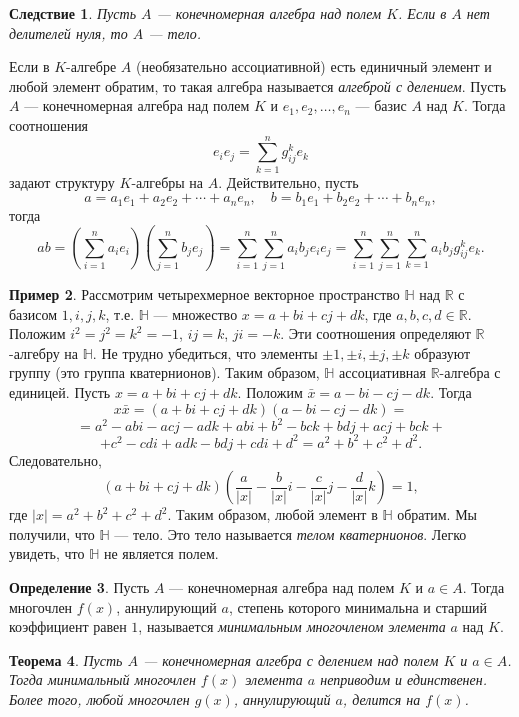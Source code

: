\documentclass[12pt, titlepage, oneside]{amsbook}
\newcommand{\HH}{\mathbb{H}}
\newcommand{\RR}{\mathbb{R}}
\newtheorem{theorem}{Теорема}[chapter]
\newtheorem{corollary}[theorem]{Следствие}
\theoremstyle{definition}
\newtheorem{example}[theorem]{Пример}
\newtheorem{definition}[theorem]{Определение}
\theoremstyle{remark}
\begin{document}
\begin{corollary}
	\label{Algebra4}
	Пусть $A$ --- конечномерная алгебра над полем $K$. Если в $A$ нет делителей нуля, то $A$ --- тело.
\end{corollary}

Если в $K$-алгебре $A$ (необязательно ассоциативной) есть единичный элемент и любой элемент обратим, то такая алгебра называется \emph{алгеброй с делением}.
Пусть $A$ --- конечномерная алгебра над полем $K$ и $e_1,e_2,\ldots,e_n$ --- базис $A$ над $K$. Тогда соотношения $$e_ie_j=\sum\limits_{k=1}^n g_{ij}^k e_k$$ задают структуру $K$-алгебры на $A$. Действительно, пусть $$a=a_1e_1+a_2e_2+\cdots+a_ne_n,\quad b=b_1e_1+b_2e_2+\cdots+b_n e_n,$$ тогда $$ab=\left(\sum\limits_{i=1}^n a_ie_i\right)\left(\sum\limits_{j=1}^n b_je_j\right)=\sum\limits_{i=1}^n\sum\limits_{j=1}^n a_ib_je_ie_j=\sum\limits_{i=1}^n\sum\limits_{j=1}^n\sum\limits_{k=1}^na_ib_jg_{ij}^k e_k.$$


\begin{example}
	Рассмотрим четырехмерное векторное пространство $\HH$ над $\RR$ с базисом $1,i,j,k$, т.е. $\HH$ --- множество $x=a+bi+cj+dk$, где $a,b,c,d\in\RR$. Положим $i^2=j^2=k^2=-1$, $ij=k$, $ji=-k$. Эти соотношения определяют $\RR$-алгебру на $\HH$. Не трудно убедиться, что элементы $\pm 1,\pm i,\pm j,\pm k$ образуют группу (это группа кватернионов). Таким образом, $\HH$ ассоциативная $\RR$-алгебра с единицей. Пусть $x=a+bi+cj+dk$. Положим $\bar{x}=a-bi-cj-dk$. Тогда $$x\bar{x}=(a+bi+cj+dk)(a-bi-cj-dk)=$$ $$=a^2-abi-acj-adk+abi+b^2-bck+bdj+acj+bck+$$ $$+c^2-cdi+adk-bdj+cdi+d^2=a^2+b^2+c^2+d^2.$$ Следовательно, $$(a+bi+cj+dk)(\frac{a}{|x|}-\frac{b}{|x|}i-\frac{c}{|x|}j-\frac{d}{|x|}k)=1,$$ где $|x|=a^2+b^2+c^2+d^2$. Таким образом, любой элемент в $\HH$ обратим. Мы получили, что $\HH$ --- тело. Это тело называется \emph{телом кватернионов}. Легко увидеть, что $\HH$ не является полем.
\end{example}

\begin{definition}
	Пусть $A$ --- конечномерная алгебра над полем $K$ и $a\in A$. Тогда многочлен $f(x)$, аннулирующий $a$, степень которого минимальна и старший коэффициент равен $1$, называется \emph{минимальным многочленом элемента} $a$ над $K$.
\end{definition}

\begin{theorem}
	\label{Algebra5} Пусть $A$ --- конечномерная алгебра с делением над полем $K$ и $a\in A$. Тогда минимальный многочлен $f(x)$ элемента $a$ неприводим и единственен. Более того, любой многочлен $g(x)$, аннулирующий $a$, делится на $f(x)$.
\end{theorem}
\end{document}

